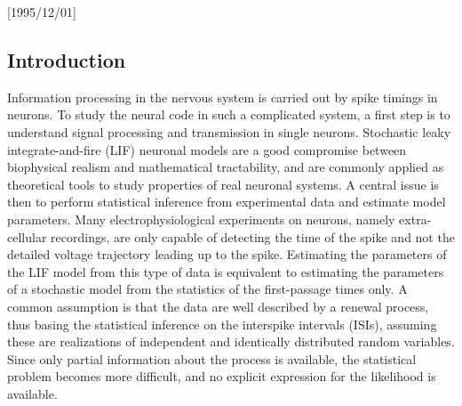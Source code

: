\NeedsTeXFormat{LaTeX2e}[1995/12/01] \documentclass[10pt]{bmc_article}
\newenvironment{bmcformat}{\begin{raggedright}\baselineskip20pt\sloppy\setboolean{publ}{false}}{\end{raggedright}\baselineskip20pt\sloppy}
\begin{document}
\begin{bmcformat}
\section{Introduction}
Information processing in the nervous system is carried out by spike timings in
neurons. To study the neural code in such a complicated system, a first step is
to understand signal processing and transmission in single neurons. Stochastic
leaky integrate-and-fire (LIF) neuronal models are a good compromise between
biophysical realism and mathematical tractability, and are commonly applied as
theoretical tools to study properties of real neuronal systems. A central issue
is then to perform statistical inference from experimental data and estimate
model parameters. Many electrophysiological experiments on neurons, namely
extra-cellular recordings, are only capable of detecting the time of the spike
and not the detailed voltage trajectory leading up to the spike. Estimating the
parameters of the LIF model from this type of data is equivalent to estimating
the parameters of a stochastic model from the statistics of the first-passage
times only. A common assumption is that the data are well described by a renewal
process, thus basing the statistical inference on the interspike intervals
(ISIs), assuming these are realizations of independent and identically
distributed random variables. Since only partial information about the process
is available, the statistical problem becomes more difficult, and no explicit
expression for the likelihood is available. 


\end{bmcformat}
\end{document}
